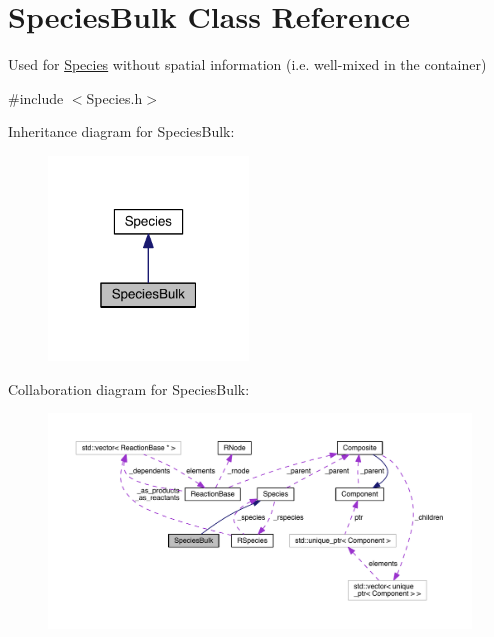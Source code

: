 \hypertarget{classSpeciesBulk}{\section{Species\+Bulk Class Reference}
\label{classSpeciesBulk}
}


Used for \hyperlink{classSpecies}{Species} without spatial information (i.\+e. well-\/mixed in the container)  




{\ttfamily \#include $<$Species.\+h$>$}



Inheritance diagram for Species\+Bulk\+:\nopagebreak
\begin{figure}[H]
\begin{center}
\leavevmode
\includegraphics[width=151pt]{classSpeciesBulk__inherit__graph}
\end{center}
\end{figure}


Collaboration diagram for Species\+Bulk\+:\nopagebreak
\begin{figure}[H]
\begin{center}
\leavevmode
\includegraphics[width=350pt]{classSpeciesBulk__coll__graph}
\end{center}
\end{figure}

